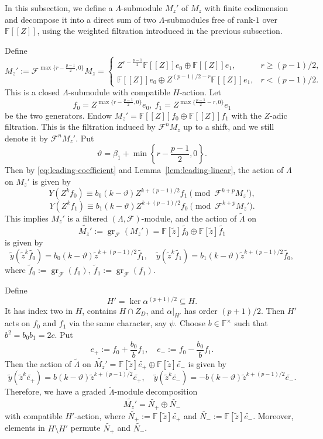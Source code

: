 \documentclass[11pt,a4paper]{article} %
\def\FF{\mathbb{F}}
\def\cF{\mathcal{F}}
\def\gr{\operatorname{gr}}
\def\max{\operatorname{max}}
\def\min{\operatorname{min}}
\begin{document}
In this subsection, we define a $\Lambda$-submodule $M_z'$ of $M_z$ with finite codimension and decompose it into a direct sum of two $\Lambda$-submodules free of rank-$1$ over $\FF[[Z]]$, using the weighted filtration introduced in the previous subsection.

Define
\[
M_z':=\cF^{\max\{r-\frac{p-1}{2},0\}}M_z=
\begin{cases}
 Z^{r-\frac{p-1}{2}}\FF[[Z]]e_0\oplus\FF[[Z]]e_1,
       &r\ge(p-1)/2,\\
 \FF[[Z]]e_0\oplus Z^{(p-1)/2-r}\FF[[Z]]e_1,
       &r<(p-1)/2.
 \end{cases}
\]
This is a closed $\Lambda$-submodule with compatible $H$-action. Let 
\[
f_0=Z^{\max\{r-\frac{p-1}{2},0\}}e_0,~f_1=Z^{\max\{\frac{p-1}{2}-r,0\}}e_1
\]
be the two generators. Endow $M_z'=\FF[[Z]]f_0\oplus\FF[[Z]]f_1$ with the $Z$-adic filtration. This is the filtration induced by $\cF^nM_z$ up to a shift, and we still denote it by $\cF^nM_z'$. Put 
\[
\vartheta=\beta_1+\min\left\{r-\frac{p-1}{2},0\right\}.
\]
Then by \eqref{eq:leading-coefficient} and Lemma~\ref{lem:leading-linear}, the action of $\Lambda$ on $M_z'$ is given by
\[
Y(Z^kf_0)\equiv b_0(k-\vartheta)Z^{k+(p-1)/2}f_1\pmod{\cF^{k+p}M_z'},
\]
\[Y(Z^kf_1)\equiv b_1(k-\vartheta)Z^{k+(p-1)/2}f_0\pmod{\cF^{k+p}M_z'}.
\]
This implies $M_z'$ is a filtered $(\Lambda,\cF)$-module, and the action of $\widetilde{\Lambda}$ on 
\[
\widetilde{M_z'}:=\gr_{\cF}(M_z')=\FF[\widetilde{z}]\widetilde{f_0}\oplus\FF[\widetilde{z}]\widetilde{f_1}
\]
is given by
\[
\widetilde{y}(\widetilde{z}^k\widetilde{f_0})=b_0(k-\vartheta)\widetilde{z}^{k+(p-1)/2}\widetilde{f_1},\quad\widetilde{y}(\widetilde{z}^k\widetilde{f_1})=b_1(k-\vartheta)\widetilde{z}^{k+(p-1)/2}\widetilde{f_0},
\]
where $\widetilde{f}_0:=\gr_{\cF}(f_0),~\widetilde{f}_1:=\gr_{\cF}(f_1)$.

Define 
\[
H'=\ker\alpha^{(p+1)/2}\subseteq H.
\]
It has index two in $H$, contains $H\cap Z_D$, and
$\alpha|_{H'}$ has order $(p+1)/2$. Then $H'$ acts on $f_0$ and $f_1$ via the same character, say $\psi$. Choose $b\in\FF^{\times}$ such that $b^2=b_0b_1=2c$. Put 
\[
e_+:=f_0+\frac{b_0}{b}f_1,\quad e_-:=f_0-\frac{b_0}{b}f_1.
\]
Then the action of $\widetilde{\Lambda}$ on $\widetilde{M_z'}=\FF[\widetilde{z}]\widetilde{e_+}\oplus\FF[\widetilde{z}]\widetilde{e_-}$ is given by
\begin{equation}\label{eq:leading-coefficient-N}
    \widetilde{y}(\widetilde{z}^k\widetilde{e_+})=b(k-\vartheta)\widetilde{z}^{k+(p-1)/2}\widetilde{e_+},\quad\widetilde{y}(\widetilde{z}^k\widetilde{e_-})=-b(k-\vartheta)\widetilde{z}^{k+(p-1)/2}\widetilde{e_-}.
\end{equation}
Therefore, we have a graded $\widetilde{\Lambda}$-module decomposition 
\[
\widetilde{M_z'}=\widetilde{N_+}\oplus\widetilde{N_-}
\]
with compatible $H'$-action, where $\widetilde{N_+}:=\FF[\widetilde{z}]\widetilde{e_+}$ and $\widetilde{N_-}:=\FF[\widetilde{z}]\widetilde{e_-}$. Moreover, elements in $H\setminus H'$ permute $\widetilde{N_+}$ and $\widetilde{N_-}$.
\end{document}
